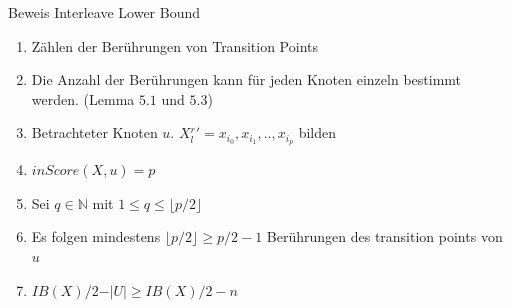 \documentclass[11pt]{beamer}
\begin{document}
\begin{frame} {Beweis Interleave Lower Bound}
	\begin{enumerate}
		\item Zählen der Berührungen von Transition Points
		\item Die Anzahl der Berührungen kann für jeden Knoten einzeln bestimmt werden. (Lemma $5.1$ und $5.3$)
		\pause
		\item Betrachteter Knoten $u$. \mbox{$X{^r_l}' = x_{i_0},x_{i_1},..,x_{i_p}$} bilden
		\item $\mathit{inScore}\left(X, u\right) = p$
		\pause
		\item  Sei $q \in \mathbb{N}$ mit $1 \leq q \leq \lfloor p / 2 \rfloor$
		\pause
		\item  Es folgen mindestens $\lfloor p/2 \rfloor \geq p/2 - 1$ Berührungen des transition points von $u$
		\pause
		\item $\mathit{IB}\left(X\right) /2 - \vert U \vert \geq \mathit{IB}\left(X\right) /2 - n$
	\end{enumerate}
	
\end{frame}
\end{document}
